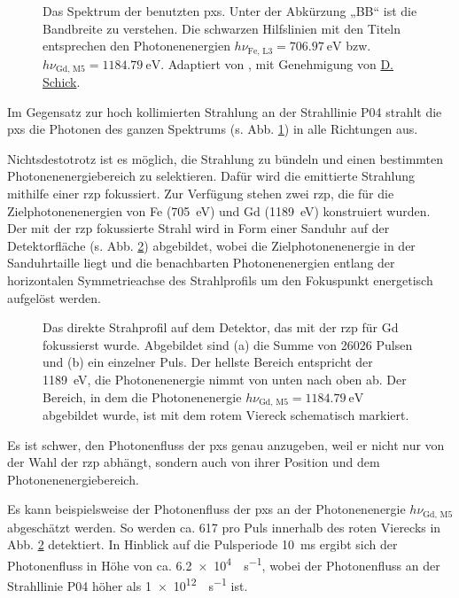 \begin{figure}[H]
    \centering
    
    \caption{Das Spektrum der benutzten \gls{pxs}. Unter der Abkürzung „BB“ ist die Bandbreite zu verstehen. Die schwarzen Hilfslinien mit den Titeln entsprechen den Photonenenergien $h\nu_{\text{Fe, L3}} = \SI{706.97}{\eV}$ bzw. $h\nu_{\text{Gd, M5}} = \SI{1184,79}{\eV}$. Adaptiert von \cite{schick_laser-driven_2021}, mit Genehmigung von \href{https://orcid.org/0000-0001-7988-6489}{D. Schick}.}
    \label{fig:pxs_spectrum}
\end{figure}
\noindent
Im Gegensatz zur hoch kollimierten Strahlung an der Strahllinie P04 strahlt die \gls{pxs} die Photonen des ganzen Spektrums (s. Abb. \ref{fig:pxs_spectrum}) in alle Richtungen aus.

\noindent
Nichtsdestotrotz ist es möglich, die Strahlung zu bündeln und einen bestimmten Photonenenergiebereich zu selektieren. Dafür wird die emittierte Strahlung mithilfe einer \gls{rzp} fokussiert. Zur Verfügung stehen zwei \gls{rzp}, die für die Zielphotonenenergien von Fe (\SI{705}{\eV}) und Gd (\SI{1189}{\eV}) konstruiert wurden. Der mit der \gls{rzp} fokussierte Strahl wird in Form einer Sanduhr auf der Detektorfläche (s. Abb. \ref{fig:butterfly_moench}) abgebildet, wobei die Zielphotonenenergie in der Sanduhrtaille liegt und die benachbarten Photonenenergien entlang der horizontalen Symmetrieachse des Strahlprofils um den Fokuspunkt energetisch aufgelöst werden.
\begin{figure}[H]
    \centering
    
    \label{fig:butterfly_moench_sum}
    \caption{Das direkte Strahprofil auf dem Detektor, das mit der \gls{rzp} für Gd fokussierst wurde. Abgebildet sind (a) die Summe von 26026 Pulsen und (b) ein einzelner Puls. Der hellste Bereich entspricht der \SI{1189}{\eV}, die Photonenenergie nimmt von unten nach oben ab. Der Bereich, in dem die Photonenenergie $h\nu_{\text{Gd, M5}} = \SI{1184,79}{\eV}$ abgebildet wurde, ist mit dem rotem Viereck schematisch markiert.}
    \label{fig:butterfly_moench}
\end{figure}
\noindent
Es ist schwer, den Photonenfluss der \gls{pxs} genau anzugeben, weil er nicht nur von der Wahl der \gls{rzp} abhängt, sondern auch von ihrer Position und dem  Photonenenergiebereich.

\noindent
Es kann beispielsweise der Photonenfluss der \gls{pxs} an der Photonenenergie $h\nu_\text{Gd, M5}$ abgeschätzt werden. So werden ca. \SI{617}{\photons} pro Puls innerhalb des roten Vierecks in Abb. \ref{fig:butterfly_moench} detektiert. In Hinblick auf die Pulsperiode \SI{10}{\milli\second} ergibt sich der Photonenfluss in Höhe von ca. \SI[per-mode = symbol]{6.2e4}{\photons\per\second}, wobei der Photonenfluss an der Strahllinie P04 höher als \SI[per-mode = symbol]{1e12}{\photons\per\second} ist.


